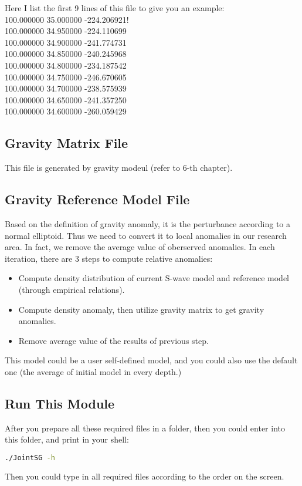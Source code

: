 \documentclass[UTF8]{article}
\begin{document}
    Here I list the first 9 lines of this file to give you an example:\\
    100.000000 35.000000 -224.206921!\\
    100.000000 34.950000 -224.110699\\
    100.000000 34.900000 -241.774731\\
    100.000000 34.850000 -240.245968\\
    100.000000 34.800000 -234.187542\\
    100.000000 34.750000 -246.670605\\
    100.000000 34.700000 -238.575939\\
    100.000000 34.650000 -241.357250\\
    100.000000 34.600000 -260.059429\\

    \subsection{Gravity Matrix File}
    This file is generated by gravity modeul (refer to 6-th chapter).

    \subsection{Gravity Reference Model File}
    Based on the definition of gravity anomaly, it is the perturbance according 
    to a normal elliptoid. Thus we need to convert it to local anomalies in our research 
    area. In fact, we remove the average value of oberserved anomalies. In each iteration, 
    there are 3 steps to compute relative anomalies:
    \begin{itemize}
        \item Compute density distribution of current S-wave model and reference model (through
            empirical relations).
        \item Compute density anomaly, then utilize gravity matrix to get gravity anomalies.
        \item Remove average value of the results of previous step.
    \end{itemize}
    This model could be a user self-defined model, and you could also use the 
    default one (the average of initial model in every depth.)

    \subsection{Run This Module}
    After you prepare all these required files in a folder, then you could enter into this folder,
    and print in your shell:
    \begin{lstlisting}[language=bash]
    ./JointSG -h
    \end{lstlisting}
    Then you could type in all required files according to the order on the screen.
\end{document}
